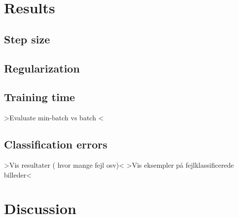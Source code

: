 \documentclass[a4paper,10pt,article,oneside,english]{memoir}
\begin{document}
\chapter{Results}\label{sec:res}

\section{Step size}\label{sec:stepsize}


\section{Regularization}\label{sec:reg}


\section{Training time}
>Evaluate min-batch vs batch <

\section{Classification errors}
>Vis resultater ( hvor mange fejl osv)<
>Vis eksempler på fejlklassificerede billeder<


\chapter{Discussion}




	
\end{document}
